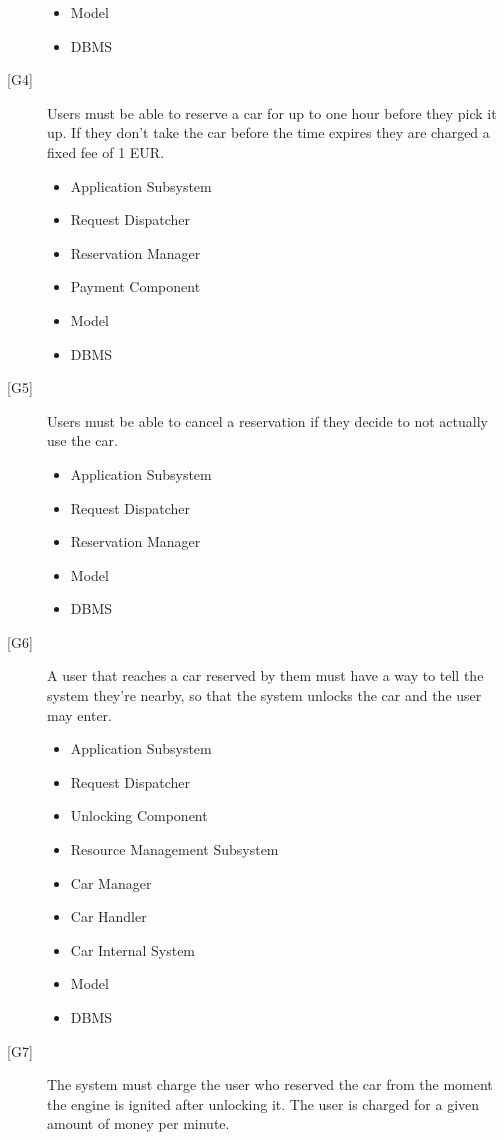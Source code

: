 \documentclass[english]{article}
\begin{document}
\begin{description}
\begin{itemize}
		\item{Model}
		\item{DBMS}
	\end{itemize}
	\item[{[G4]}]{Users must be able to reserve a car for up to one hour before they pick it up. If they don't take the car before the time expires they are charged a fixed fee of 1 EUR.}
	\begin{itemize}
		\item{Application Subsystem}
		\item{Request Dispatcher}
		\item{Reservation Manager}
		\item{Payment Component}
		\item{Model}
		\item{DBMS}
	\end{itemize}
	\item[{[G5]}]{Users must be able to cancel a reservation if they decide to not actually use the car.}
	\begin{itemize}
		\item{Application Subsystem}
		\item{Request Dispatcher}
		\item{Reservation Manager}
		\item{Model}
		\item{DBMS}
	\end{itemize}
	\item[{[G6]}]{A user that reaches a car reserved by them must have a way to tell the system they’re nearby, so that the system unlocks the car and the user may enter.}
	\begin{itemize}
		\item{Application Subsystem}
		\item{Request Dispatcher}
		\item{Unlocking Component}
		\item{Resource Management Subsystem}
		\item{Car Manager}
		\item{Car Handler}
		\item{Car Internal System}
		\item{Model}
		\item{DBMS}
	\end{itemize}
	\item[{[G7]}]{The system must charge the user who reserved the car from the moment the engine is ignited after unlocking it. The user is charged for a given	amount of money per minute.}
	\begin{itemize}

\end{itemize}
\end{description}
\end{document}
